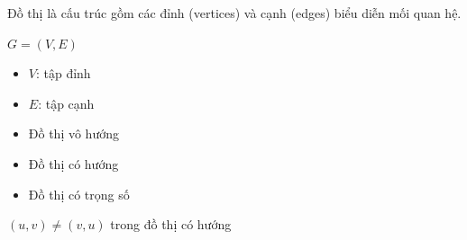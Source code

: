 \documentclass{beamer}
\title{\hlred{Khái niệm cơ bản về Đồ Thị}}
\author{NHÓM 3}
\date{\today}
\newcommand{\hlblue}[1]{\textcolor{myblue}{#1}}
\newcommand{\hlgreen}[1]{\textcolor{mygreen}{#1}}
\newcommand{\hlpurple}[1]{\textcolor{mypurple}{#1}}
\begin{document}
\frame{\titlepage}


\begin{frame}{}
\begin{tcolorbox}[title=\textbf{\hlgreen{Định nghĩa}}]
Đồ thị là cấu trúc gồm các \hlblue{đỉnh (vertices)} và \hlblue{cạnh (edges)} biểu diễn mối quan hệ.
\end{tcolorbox}

\begin{tcolorbox}
\centering
\hlpurple{$G = (V, E)$}
\end{tcolorbox}

\begin{itemize}
\item $V$: tập đỉnh
\item $E$: tập cạnh
\end{itemize}
\end{frame}


\begin{frame}{}
\centering
{}
\end{frame}


\begin{frame}{}
\begin{itemize}
\item \hlblue{Đồ thị vô hướng}
\item \hlblue{Đồ thị có hướng}
\item \hlblue{Đồ thị có trọng số}
\end{itemize}

\begin{tcolorbox}
\centering
\hlpurple{$(u,v) \neq (v,u)$ trong đồ thị có hướng}
\end{tcolorbox}
\end{frame}

\end{document}
